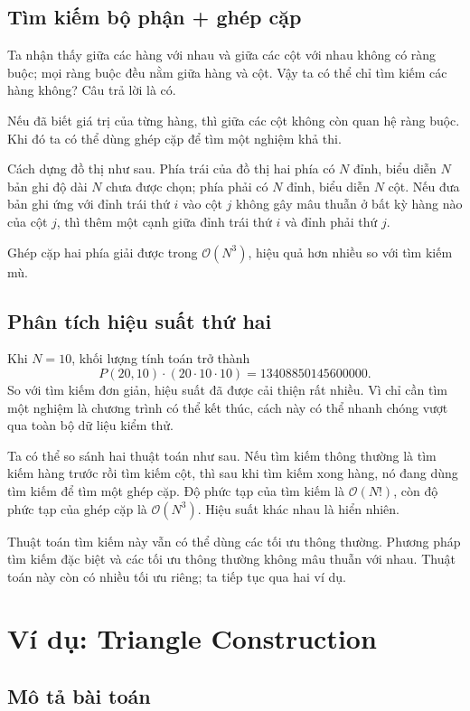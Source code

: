 \documentclass[11pt]{article}
\newcommand{\Oh}{\mathcal{O}}
\begin{document}
\subsection{Tìm kiếm bộ phận + ghép cặp}

Ta nhận thấy giữa các hàng với nhau và giữa các cột với nhau không có ràng
buộc; mọi ràng buộc đều nằm giữa hàng và cột. Vậy ta có thể chỉ tìm kiếm các
hàng không? Câu trả lời là có.

Nếu đã biết giá trị của từng hàng, thì giữa các cột không còn quan hệ ràng
buộc. Khi đó ta có thể dùng ghép cặp để tìm một nghiệm khả thi.

Cách dựng đồ thị như sau. Phía trái của đồ thị hai phía có $N$ đỉnh, biểu
diễn $N$ bản ghi độ dài $N$ chưa được chọn; phía phải có $N$ đỉnh, biểu diễn
$N$ cột. Nếu đưa bản ghi ứng với đỉnh trái thứ $i$ vào cột $j$ không gây mâu
thuẫn ở bất kỳ hàng nào của cột $j$, thì thêm một cạnh giữa đỉnh trái thứ $i$
và đỉnh phải thứ $j$.

Ghép cặp hai phía giải được trong $\Oh(N^3)$, hiệu quả hơn nhiều so với tìm
kiếm mù.

\subsection{Phân tích hiệu suất thứ hai}

Khi $N=10$, khối lượng tính toán trở thành
\[
  P(20,10)\cdot(20\cdot 10\cdot 10)=13408850145600000.
\]
So với tìm kiếm đơn giản, hiệu suất đã được cải thiện rất nhiều. Vì chỉ cần
tìm một nghiệm là chương trình có thể kết thúc, cách này có thể nhanh chóng
vượt qua toàn bộ dữ liệu kiểm thử.

Ta có thể so sánh hai thuật toán như sau. Nếu tìm kiếm thông thường là tìm
kiếm hàng trước rồi tìm kiếm cột, thì sau khi tìm kiếm xong hàng, nó đang dùng
tìm kiếm để tìm một ghép cặp. Độ phức tạp của tìm kiếm là $\Oh(N!)$, còn độ
phức tạp của ghép cặp là $\Oh(N^3)$. Hiệu suất khác nhau là hiển nhiên.

Thuật toán tìm kiếm này vẫn có thể dùng các tối ưu thông thường. Phương pháp
tìm kiếm đặc biệt và các tối ưu thông thường không mâu thuẫn với nhau. Thuật
toán này còn có nhiều tối ưu riêng; ta tiếp tục qua hai ví dụ.

\section{Ví dụ: Triangle Construction}

\subsection{Mô tả bài toán}
\end{document}
